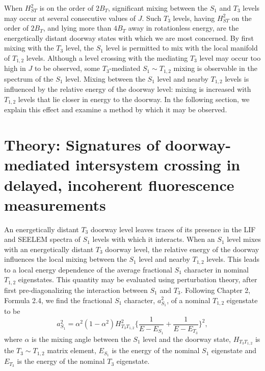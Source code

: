 \documentclass[12pt]{mitthesis}
\begin{document}
When $H_{ST}^2$ is on the order of $2B_T$, significant mixing between
the $S_1$ and $T_3$ levels may occur at several consecutive values of
$J$.  Such $T_3$ levels, having $H_{ST}^2$ on the order of $2B_T$, and
lying more than $4B_T$ away in rotationless energy, are the
energetically distant doorway states with which we are most concerned.
By first mixing with the $T_3$ level, the $S_1$ level is permitted to
mix with the local manifold of $T_{1,2}$ levels.  Although a level
crossing with the mediating $T_3$ level may occur too high in $J$ to
be observed, some $T_3$-mediated $S_1 \sim T_{1,2}$ mixing is
observable in the spectrum of the $S_1$ level.  Mixing between the
$S_1$ level and nearby $T_{1,2}$ levels is influenced by the relative
energy of the doorway level: mixing is increased with $T_{1,2}$ levels
that lie closer in energy to the doorway.  In the following section,
we explain this effect and examine a method by which it may be
observed.



























\section{Theory: Signatures of doorway-mediated intersystem crossing
  in delayed, incoherent fluorescence measurements}

An energetically distant $T_3$ doorway level leaves traces of its
presence in the LIF and SEELEM spectra of $S_1$ levels with which it
interacts.  When an $S_1$ level mixes with an energetically distant
$T_3$ doorway level, the relative energy of the doorway influences the
local mixing between the $S_1$ level and nearby $T_{1,2}$ levels.
This leads to a local energy dependence of the average fractional
$S_1$ character in nominal $T_{1,2}$ eigenstates.  This quantity may
be evaluated using perturbation theory, after first pre-diagonalizing
the interaction between $S_1$ and $T_3$.  Following Chapter 2, Formula
2.4, we find the fractional $S_1$ character, $a_{S_1}^2$, of a nominal
$T_{1,2}$ eigenstate to be
\begin{equation}
  \label{eq:ave-s1-char}
    a_{S_1}^2 = 
    \alpha^2 (1-\alpha^2) H_{T_3T_{1,2}}^2
    \biggl \lbrace 
    \frac{1}{E - E_{S_1}} 
    + \frac{1}{E - E_{T_3}} 
    \biggr \rbrace^2,
\end{equation}
where $\alpha$ is the mixing angle between the $S_1$ level and the
doorway state, $H_{T_3T_{1,2}}$ is the $T_3 \sim T_{1,2}$ matrix
element, $E_{S_1}$ is the energy of the nominal $S_1$ eigenstate and
$E_{T_3}$ is the energy of the nominal $T_3$ eigenstate.
\end{document}
